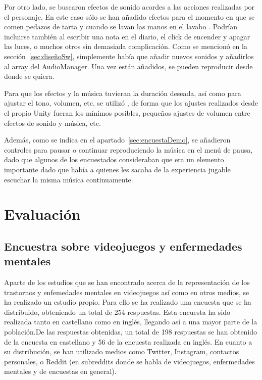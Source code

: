 \documentclass[12pt, a4paper,twoside,titlepage]{book}
\begin{document}
Por otro lado, se buscaron efectos de sonido acordes a las acciones realizadas por el personaje. En este caso sólo se han añadido efectos para el momento en que se comen pedazos de tarta  y cuando se lavan las manos en el lavabo . Podrían incluirse también al escribir una nota en el diario, el click de encender y apagar las luces, o muchos otros sin demasiada complicación. Como se mencionó en la sección~\ref{sec:diseñoSw}, simplemente había que añadir nuevos sonidos y añadirlos al array del AudioManager. Una vez están añadidos, se pueden reproducir desde donde se quiera. 

Para que los efectos y la música tuvieran la duración deseada, así como para ajustar el tono, volumen, etc. se utilizó , de forma que los ajustes realizados desde el propio Unity fueran los mínimos posibles, pequeños ajustes de volumen entre efectos de sonido y música, etc. 

Además, como se indica en el apartado~\ref{sec:encuestaDemo}, se añadieron controles para pausar o continuar reproduciendo la música en el menú de pausa, dado que algunos de los encuestados consideraban que era un elemento importante dado que había a quienes les sacaba de la experiencia jugable escuchar la misma música continuamente. 



\chapter {Evaluación}

\section{Encuestra sobre videojuegos y enfermedades mentales}
\label{sec:encuestaVid}
Aparte de los estudios que se han encontrado acerca de la representación de los trastornos y enfemedades mentales en videojuegos así como en otros medios, se ha realizado un estudio propio. Para ello se ha realizado una encuesta que se ha distribuido, obteniendo un total de 254 respuestas. Esta encuesta ha sido realizada tanto en castellano como en inglés, llegando así a una mayor parte de la población.De las respuestas obtenidas, un total de 198 respuestas se han obtenido de la encuesta en castellano y 56 de la encuesta realizada en inglés. En cuanto a su distribución, se han utilizado medios como Twitter, Instagram, contactos personales, o Reddit (en subreddits donde se habla de videojuegos, enfermedades mentales y de encuestas en general). 
\end{document}
